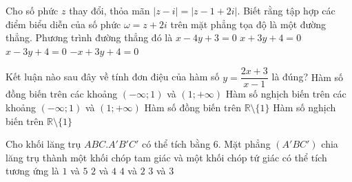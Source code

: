 \begin{ex}%
Cho số phức $z$ thay đổi, thỏa mãn $|z-i|=|z-1+2i|.$ Biết rằng tập hợp các điểm biểu diễn của số phức $\omega =z+2i$ trên mặt phẳng tọa độ là một đường thẳng. Phương trình đường thẳng đó là
\choice
{$x-4y+3=0$}
{$x+3y+4=0$}
{\True $x-3y+4=0$}
{$-x+3y+4=0$}
\end{ex}

\begin{ex}%
Kết luận nào sau đây về tính đơn điệu của hàm số $y=\dfrac{2x+3}{x-1}$ là đúng?
\choice
{Hàm số đồng biến trên các khoảng $(-\infty; 1)$ và $(1; +\infty)$}
{\True Hàm số nghịch biến trên các khoảng $(-\infty; 1)$ và $(1; +\infty)$}
{Hàm số đồng biến trên $\mathbb{R}\setminus \{1\}$}
{Hàm số nghịch biến trên $\mathbb{R}\setminus \{1\}$}

\end{ex}

\begin{ex}%
Cho khối lăng trụ $ABC.A'B'C'$ có thể tích bằng 6. Mặt phẳng $(A'BC')$ chia lăng trụ thành một khối chóp tam giác và một khối chóp tứ giác có thể tích tương ứng là
\choice
{$1$ và $5$}
{\True $2$ và $4$}
{$4$ và $2$}
{$3$ và $3$}

\end{ex}

